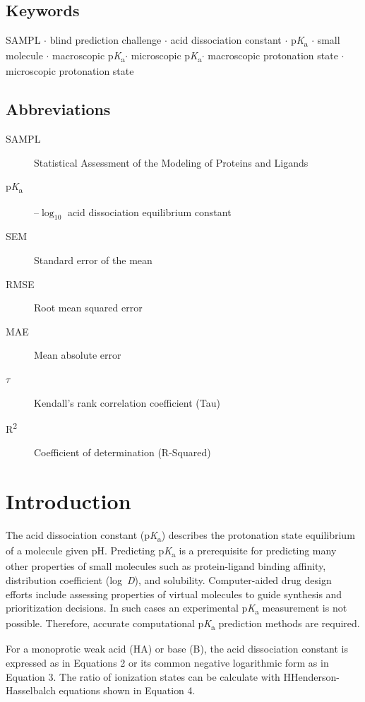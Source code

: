 \documentclass[9pt,lineno,final]{elife}
\newcommand{\pKa}{p\textit{K}\textsubscript{a}}
\newcommand{\logD}{log~\textit{D}}
\begin{document}
\subsection{Keywords}
SAMPL $\cdot$ blind prediction challenge $\cdot$ acid dissociation constant $\cdot$ \pKa{} $\cdot$ small molecule $\cdot$ macroscopic \pKa $\cdot$ microscopic \pKa  $\cdot$ macroscopic protonation state $\cdot$ microscopic protonation state

\subsection{Abbreviations}
\begin{description}
\item[SAMPL] Statistical Assessment of the Modeling of Proteins and Ligands
\item[\pKa]  --${\log_{10}}$ acid dissociation equilibrium constant 
\item[SEM] Standard error of the mean
\item[RMSE] Root mean squared error
\item[MAE] Mean absolute error
\item[{$\tau$}] Kendall's rank correlation coefficient (Tau)
\item[R\textsuperscript{2}] Coefficient of determination (R-Squared)
\end{description}


\section{Introduction}

The acid dissociation constant (\pKa{}) describes the protonation state equilibrium of a molecule given pH. Predicting \pKa{} is a prerequisite for predicting many other properties of small molecules such as protein-ligand binding affinity, distribution coefficient (\logD{}), and solubility. 
Computer-aided drug design efforts include assessing properties of virtual molecules to guide synthesis and prioritization decisions. In such cases an experimental \pKa{} measurement is not possible. Therefore, accurate computational \pKa{} prediction methods are required.

For a monoprotic weak acid (HA) or base (B), the acid dissociation constant is expressed as in Equations 2 or its common negative logarithmic form as in Equation 3. The ratio of ionization states can be calculate with HHenderson-Hasselbalch equations shown in Equation 4. 
\end{document}
